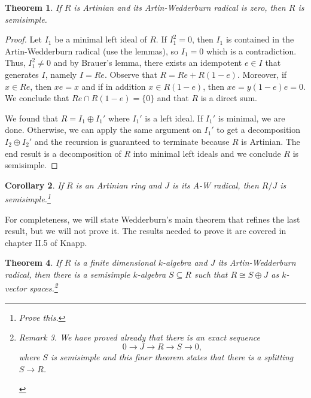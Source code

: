 \documentclass{tufte-handout} %
\newtheorem{thm}{Theorem}
\newtheorem{cor}[thm]{Corollary}
\theoremstyle{definition}
\theoremstyle{remark}
\newtheorem{rem}[thm]{Remark}
\begin{document}
\begin{thm}\label{zeroawrad}
	If $R$ is Artinian and its Artin-Wedderburn radical is zero, then $R$ is semisimple.
\end{thm}
\begin{proof}
	Let $I_1$ be a minimal left ideal of $R$. If $I_1^2 = 0$, then $I_1$ is contained in the Artin-Wedderburn radical (use the lemmas), so $I_1 = 0$ which is a contradiction. Thus, $I_1^2 \neq 0$ and by Brauer's lemma, there exists an idempotent $e \in I$ that generates $I$, namely $I = Re$. Observe that $R = Re + R(1-e)$. Moreover, if $x \in Re$, then $xe = x$ and if in addition $x \in R(1-e)$, then $xe = y(1-e)e = 0$.  We conclude that $Re \cap R(1-e) = \{0\}$ and that $R$ is a direct sum.
	
	We found that $R = I_1 \oplus I_1'$ where $I_1'$ is a left ideal. If $I_1'$ is minimal, we are done. Otherwise, we can apply the same argument on $I_1'$ to get a decomposition $I_2 \oplus I_2'$ and the recursion is guaranteed to terminate because $R$ is Artinian. The end result is a decomposition of $R$ into minimal left ideals and we conclude $R$ is semisimple.
\end{proof}
\begin{cor}
	If $R$ is an Artinian ring and $J$ is its A-W radical, then $R/J$ is semisimple.\footnote{Prove this.}
\end{cor}
For completeness, we will state Wedderburn's main theorem that refines the last result, but we will not prove it. The results needed to prove it are covered in chapter II.5 of Knapp.
\begin{thm}
	If $R$ is a finite dimensional $k$-algebra and $J$ its Artin-Wedderburn radical, then there is a semisimple $k$-algebra $S \subseteq R$ such that $R \cong S \oplus J$ as $k$-vector spaces.\footnote{
		\begin{rem}
			We have proved already that there is an exact sequence
			\[0 \rightarrow J \rightarrow R \rightarrow S \rightarrow 0,\]
			where $S$ is semisimple and this finer theorem states that there is a splitting $S \rightarrow R$.
	\end{rem}}
\end{thm}
\end{document}
